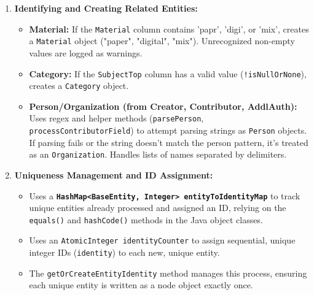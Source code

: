 \documentclass[11pt, a4paper]{article}
\begin{document}
\begin{enumerate}
    \item \textbf{Identifying and Creating Related Entities:}
        \begin{itemize}
            \item \textbf{Material:} If the \texttt{Material} column contains 'papr', 'digi', or 'mix', creates a \texttt{Material} object ("paper", "digital", "mix"). Unrecognized non-empty values are logged as warnings.
            \item \textbf{Category:} If the \texttt{SubjectTop} column has a valid value (\texttt{!isNullOrNone}), creates a \texttt{Category} object.
            \item \textbf{Person/Organization (from Creator, Contributor, AddlAuth):} Uses regex and helper methods (\texttt{parsePerson}, \texttt{processContributorField}) to attempt parsing strings as \texttt{Person} objects. If parsing fails or the string doesn't match the person pattern, it's treated as an \texttt{Organization}. Handles lists of names separated by delimiters.
        \end{itemize}

    \item \textbf{Uniqueness Management and ID Assignment:}
        \begin{itemize}
            \item Uses a \textbf{\texttt{HashMap<BaseEntity, Integer> entityToIdentityMap}} to track unique entities already processed and assigned an ID, relying on the \texttt{equals()} and \texttt{hashCode()} methods in the Java object classes.
            \item Uses an \texttt{AtomicInteger identityCounter} to assign sequential, unique integer IDs (\texttt{identity}) to each new, unique entity.
            \item The \texttt{getOrCreateEntityIdentity} method manages this process, ensuring each unique entity is written as a node object exactly once.
        \end{itemize}


\end{enumerate}
\end{document}
